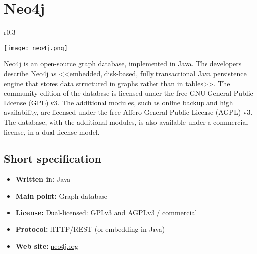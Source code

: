 \chapter{Neo4j}

\begin{wrapfigure}{r}{0.3\textwidth}
  \vspace{-42pt}
  \begin{center}
    \texttt{[image: neo4j.png]}
  \end{center}
  \vspace{30pt}
\end{wrapfigure}
Neo4j is an open-source graph database, implemented in Java. The developers describe Neo4j as <<embedded, disk-based, fully transactional Java persistence engine that stores data structured in graphs rather than in tables>>. The community edition of the database is licensed under the free GNU General Public License (GPL) v3. The additional modules, such as online backup and high availability, are licensed under the free Affero General Public License (AGPL) v3. The database, with the additional modules, is also available under a commercial license, in a dual license model.

\section{Short specification}

\begin{itemize}
  \item \textbf{Written in:} Java
  \item \textbf{Main point:} Graph database
  \item \textbf{License:} Dual-licensed: GPLv3 and AGPLv3 / commercial
  \item \textbf{Protocol:} HTTP/REST (or embedding in Java)
  \item \textbf{Web site:} \href{http://neo4j.org/}{neo4j.org}
\end{itemize}